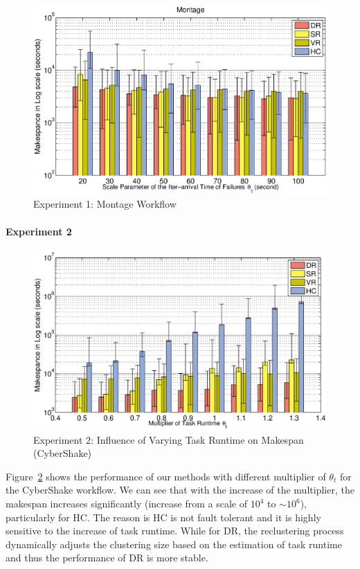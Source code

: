 \documentclass{IOS-Book-Article}
\begin{document}
\begin{figure}[!htb]
\centering
  \includegraphics[width=1\linewidth]{montage.eps}
  \caption{Experiment 1: Montage Workflow}
  \label{fig:expr_montage}
\end{figure}

\paragraph{\textbf{Experiment 2}}

\begin{figure}[!htb]
\centering
  \includegraphics[width=1\linewidth]{t.eps}
  \caption{Experiment 2:  Influence of Varying Task Runtime on Makespan (CyberShake)}
  \label{fig:expr_t}
\end{figure}

Figure~\ref{fig:expr_t} shows the performance of our methods with different multiplier of $\theta_{t}$ for the CyberShake workflow. We can see that with the increase of the multiplier, the makespan increases significantly (increase from a scale of $10^4$ to $\sim 10^6$), particularly for HC. The reason is HC is not fault tolerant and it is highly sensitive to the increase of task runtime. While for DR, the reclustering process dynamically adjusts the clustering size based on the estimation of task runtime and thus the performance of DR is more stable. 
\end{document}
